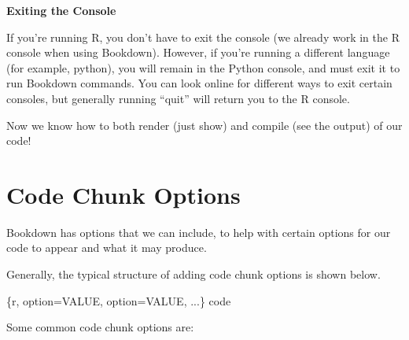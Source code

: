 \documentclass[
]{book}
\newenvironment{Shaded}{\begin{snugshade}}{\end{snugshade}}
\newcommand{\NormalTok}[1]{#1}
\newenvironment{bluebox}{
  \definecolor{shadecolor}{RGB}{172, 210, 237}
  \color{white}
  \begin{shaded}}
 {\end{shaded}}
\theoremstyle{definition}
\theoremstyle{definition}
\theoremstyle{definition}
\theoremstyle{definition}
\theoremstyle{remark}
\begin{document}
\begin{bluebox}

\begin{center}
\textbf{Exiting the Console}

\end{center}

If you're running R, you don't have to exit the console (we already work in the R console when using Bookdown). However, if you're running a different language (for example, python), you will remain in the Python console, and must exit it to run Bookdown commands. You can look online for different ways to exit certain consoles, but generally running ``quit'' will return you to the R console.

\end{bluebox}

Now we know how to both render (just show) and compile (see the output) of our code!

\section{Code Chunk Options}\label{code-chunk-options}

Bookdown has options that we can include, to help with certain options for our code to appear and what it may produce.

Generally, the typical structure of adding code chunk options is shown below.

\begin{Shaded}
\begin{Highlighting}[]
\NormalTok{\textasciigrave{}\textasciigrave{}\textasciigrave{}\{r, option=VALUE, option=VALUE, ...\}}
\NormalTok{code}
\NormalTok{\textasciigrave{}\textasciigrave{}\textasciigrave{}}
\end{Highlighting}
\end{Shaded}

Some common code chunk options are:
\end{document}
